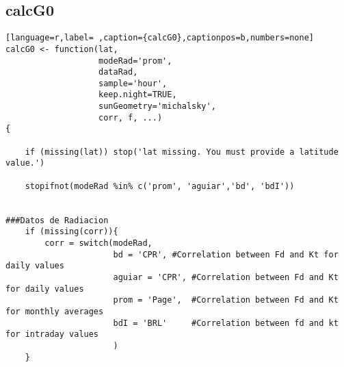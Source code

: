 \subsection{calcG0}
\label{sec:org0de4912}
\label{subsec:calcg0}
\begin{lstlisting}[language=r,label= ,caption={calcG0},captionpos=b,numbers=none]
calcG0 <- function(lat,
                   modeRad='prom',
                   dataRad,
                   sample='hour',
                   keep.night=TRUE,
                   sunGeometry='michalsky',
                   corr, f, ...)
{

    if (missing(lat)) stop('lat missing. You must provide a latitude value.')

    stopifnot(modeRad %in% c('prom', 'aguiar','bd', 'bdI'))


###Datos de Radiacion
    if (missing(corr)){
        corr = switch(modeRad,
                      bd = 'CPR', #Correlation between Fd and Kt for daily values
                      aguiar = 'CPR', #Correlation between Fd and Kt for daily values
                      prom = 'Page',  #Correlation between Fd and Kt for monthly averages
                      bdI = 'BRL'     #Correlation between fd and kt for intraday values
                      )
    }


\end{lstlisting}
